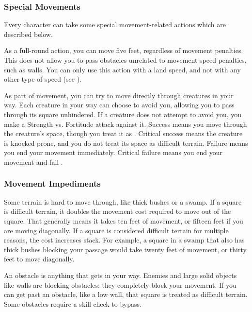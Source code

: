         \subsubsection{Special Movements}

            Every character can take some special movement-related actions which are described below.

             As a full-round action, you can move five feet, regardless of movement penalties.
            This does not allow you to pass obstacles unrelated to movement speed penalties, such as walls.
            You can only use this action with a land speed, and not with any other type of speed (see ).

            \label{Overrun} As part of movement, you can try to move directly through creatures in your way.
            Each creature in your way can choose to avoid you, allowing you to pass through its square unhindered.
            If a creature does not attempt to avoid you, you make a Strength vs. Fortitude attack against it.
            Success means you move through the creature's space, though you treat it as .
            Critical success means the creature is knocked prone, and you do not treat its space as difficult terrain.
            Failure means you end your movement immediately.
            Critical failure means you end your movement and fall \prone.

        \subsubsection{Movement Impediments}

            \label{Difficult Terrain}
            Some terrain is hard to move through, like thick bushes or a swamp. If a square is difficult terrain, it doubles the movement cost required to move out of the square. That generally means it takes ten feet of movement, or fifteen feet if you are moving diagonally. If a square is considered difficult terrain for multiple reasons, the cost increases stack. For example, a square in a swamp that also has thick bushes blocking your passage would take twenty feet of movement, or thirty feet to move diagonally.

            An obstacle is anything that gets in your way. Enemies and large solid objects like walls are blocking obstacles: they completely block your movement. If you can get past an obstacle, like a low wall, that square is treated as difficult terrain. Some obstacles require a skill check to bypass.

